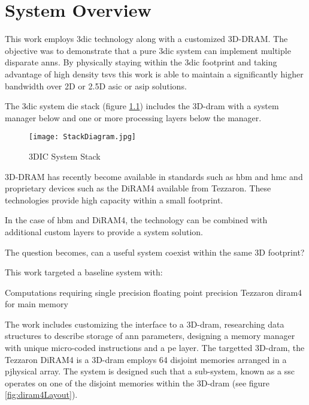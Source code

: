 



\chapter{System Overview}
\label{chap-five}
\label{sec:System Overview}
This work employs \ac{3dic} technology along with a customized 3D-DRAM. The objective was to demonstrate that a pure \ac{3dic} system can implement multiple disparate \acp{ann}. By physically staying within the \ac{3dic} footprint and taking advantage of high
density \acp{tsv} this work is able to maintain a significantly higher bandwidth over 2D or 2.5D \ac{asic} or \ac{asip} solutions.

The \ac{3dic} system die stack (figure \ref{fig:3DICStack}) includes the 3D-\ac{dram} with a system manager below and one or more processing layers below the manager.
\begin{figure}[!t]
\centering
\captionsetup{justification=centering}
\captionsetup{width=.9\linewidth}
\centerline{
\mbox{\texttt{[image: StackDiagram.jpg]}}
}
\caption{3DIC System Stack}
\label{fig:3DICStack}
\end{figure}

3D-DRAM has recently become available in standards such as \ac{hbm} and \ac{hmc} and proprietary devices such as the DiRAM4 available from Tezzaron. 
These technologies provide high capacity within a small footprint.

In the case of \ac{hbm} and DiRAM4, the technology can be combined with additional custom layers to provide a system solution.

The question becomes, can a useful system coexist within the same 3D footprint?

This work targeted a baseline system with:
\begin{outline}
  \1 Computations requiring single precision floating point precision
  \1 Tezzaron \acf{diram4} \cite{tezzaron:diram4} for main memory
\end{outline}
The work includes customizing the interface to a 3D-\ac{dram}, researching data structures to describe storage of \ac{ann} parameters, designing a memory manager with unique micro-coded instructions and a \ac{pe} layer.  
The targetted 3D-\ac{dram}, the Tezzaron DiRAM4 is a 3D-\ac{dram} employs 64 disjoint memories arranged in a pjhysical array.
The system is designed such that a sub-system, known as a \ac{ssc} operates on one of the disjoint memories within the 3D-\ac{dram} (see figure \ref{fig:diram4Layout}).

